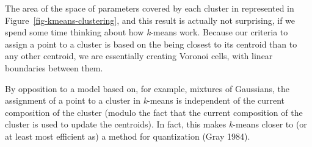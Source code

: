 \documentclass[
  letterpaper,
]{scrbook}
\begin{document}
\begin{table}

\caption{\label{tbl-clustering-centers}Summary of the values for the
centers of the optimal clusters found in this image. The cover column
gives the percentage of all pixels associated to this class. The
clusters are sorted by the NDVI of their centroid.}


\end{table}%


The area of the space of parameters covered by each cluster in
represented in Figure~\ref{fig-kmeans-clustering}, and this result is
actually not surprising, if we spend some time thinking about how
\emph{k}-means work. Because our criteria to assign a point to a cluster
is based on the being closest to its centroid than to any other
centroid, we are essentially creating Voronoi cells, with linear
boundaries between them.

By opposition to a model based on, for example, mixtures of Gaussians,
the assignment of a point to a cluster in \emph{k}-means is independent
of the current composition of the cluster (modulo the fact that the
current composition of the cluster is used to update the centroids). In
fact, this makes \emph{k}-means closer to (or at least most efficient
as) a method for quantization (Gray 1984).
\end{document}
